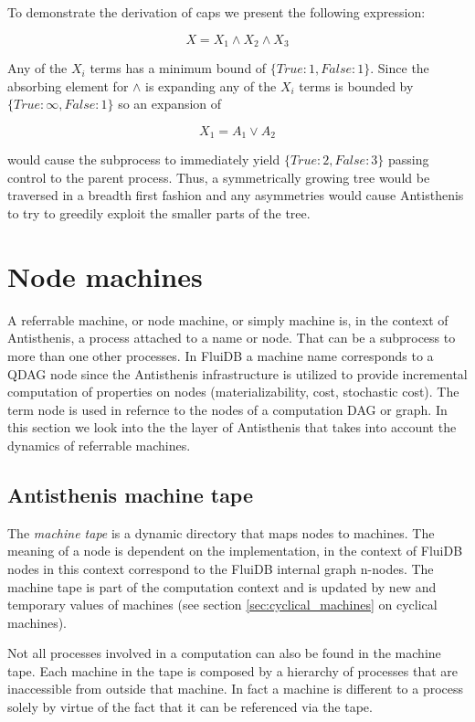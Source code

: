 To demonstrate the derivation of caps we present the following
expression:

\[
X = X_1 \land X_2 \land X_3
\]

Any of the \(X_i\) terms has a minimum bound of
\(\{True: 1, False: 1 \}\). Since the absorbing element for \(\land\)
is  expanding any of the \(X_i\) terms is bounded by
\(\{True: \infty, False: 1 \}\) so an expansion of

\[
X_1 = A_1 \lor A_2
\]

would cause the subprocess to immediately yield
\(\{True: 2, False: 3 \}\) passing control to the parent
process. Thus, a symmetrically growing tree would be traversed in a
breadth first fashion and any asymmetries would cause Antisthenis to
try to greedily exploit the smaller parts of the tree.

\section{Node machines}
\label{sec:antisthenis_machines}

A referrable machine, or node machine, or simply machine is, in the
context of Antisthenis, a process attached to a name or node. That can
be a subprocess to more than one other processes. In FluiDB a machine
name corresponds to a QDAG node since the Antisthenis infrastructure
is utilized to provide incremental computation of properties on nodes
(materializability, cost, stochastic cost). The term node is used in
refernce to the nodes of a computation DAG or graph. In this section
we look into the the layer of Antisthenis that takes into account the
dynamics of referrable machines.

\subsection{Antisthenis machine tape}

The \emph{machine tape} is a dynamic directory that maps nodes to
machines. The meaning of a node is dependent on the implementation, in
the context of FluiDB nodes in this context correspond to the FluiDB
internal graph n-nodes.  The machine tape is part of the computation
context and is updated by new and temporary values of machines (see
section \ref{sec:cyclical_machines} on cyclical machines).

Not all processes involved in a computation can also be found in the
machine tape. Each machine in the tape is composed by a hierarchy of
processes that are inaccessible from outside that machine. In fact a
machine is different to a process solely by virtue of the fact that it
can be referenced via the tape.

